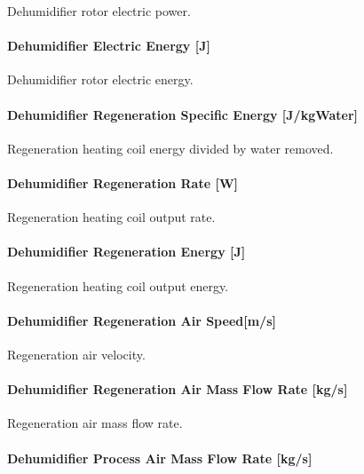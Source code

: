 Dehumidifier rotor electric power.

\paragraph{Dehumidifier Electric Energy {[}J{]}}\label{dehumidifier-electric-energy-j}

Dehumidifier rotor electric energy.

\paragraph{Dehumidifier Regeneration Specific Energy {[}J/kgWater{]}}\label{dehumidifier-regeneration-specific-energy-jkgwater}

Regeneration heating coil energy divided by water removed.

\paragraph{Dehumidifier Regeneration Rate {[}W{]}}\label{dehumidifier-regeneration-rate-w}

Regeneration heating coil output rate.

\paragraph{Dehumidifier Regeneration Energy {[}J{]}}\label{dehumidifier-regeneration-energy-j}

Regeneration heating coil output energy.

\paragraph{Dehumidifier Regeneration Air Speed{[}m/s{]}}\label{dehumidifier-regeneration-air-speedms}

Regeneration air velocity.

\paragraph{Dehumidifier Regeneration Air Mass Flow Rate {[}kg/s{]}}\label{dehumidifier-regeneration-air-mass-flow-rate-kgs}

Regeneration air mass flow rate.

\paragraph{Dehumidifier Process Air Mass Flow Rate {[}kg/s{]}}\label{dehumidifier-process-air-mass-flow-rate-kgs}

